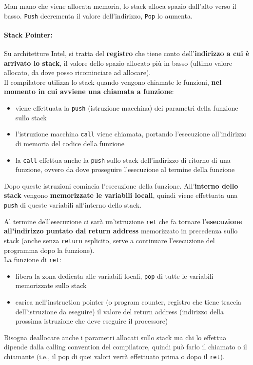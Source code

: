 Man mano che viene allocata memoria, lo stack alloca spazio dall'alto verso il basso. \texttt{Push} decrementa il valore dell'indirizzo, \texttt{Pop} lo aumenta.\\

\paragraph{Stack Pointer:} Su architetture Intel, si tratta del \textbf{registro} che tiene conto dell'\textbf{indirizzo a cui è arrivato lo stack}, il valore dello spazio allocato più in basso (ultimo valore allocato, da dove posso ricominciare ad allocare).\\

Il compilatore utilizza lo stack quando vengono chiamate le funzioni, \textbf{nel momento in cui avviene una chiamata a funzione}:
\begin{itemize}
	\item viene effettuata la \texttt{push} (istruzione macchina) dei parametri della funzione sullo stack
	\item l'istruzione macchina \texttt{call} viene chiamata, portando l'esecuzione all'indirizzo di memoria del codice della funzione
	\item la \texttt{call} effettua anche la \texttt{push} sullo stack dell'indirizzo di ritorno di una funzione, ovvero da dove proseguire l'esecuzione al termine della funzione 
\end{itemize} 

Dopo queste istruzioni comincia l'esecuzione della funzione. All'\textbf{interno dello stack} vengono \textbf{memorizzate le variabili locali}, quindi viene effettuata una \texttt{push} di queste variabili all'interno dello stack.\\

\newpage

Al termine dell'esecuzione ci sarà un'istruzione \texttt{ret} che fa tornare l'\textbf{esecuzione all'indirizzo puntato dal return address} memorizzato in precedenza sullo stack (anche senza \texttt{return} esplicito, serve a continuare l'esecuzione del programma dopo la funzione).\\

La funzione di \texttt{ret}: 
\begin{itemize}
	\item libera la zona dedicata alle variabili locali, \texttt{pop} di tutte le variabili memorizzate sullo stack
	\item carica nell'instruction pointer (o program counter, registro che tiene traccia dell'istruzione da eseguire) il valore del return address (indirizzo della prossima istruzione che deve eseguire il processore)
\end{itemize}
Bisogna deallocare anche i parametri allocati sullo stack ma chi lo effettua dipende dalla calling convention del compilatore, quindi può farlo il chiamato o il chiamante (i.e., il pop di quei valori verrà effettuato prima o dopo il \texttt{ret}).\\

